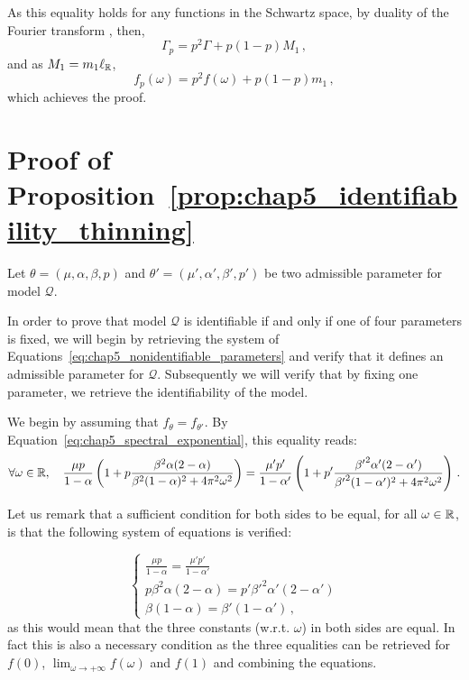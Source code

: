\begin{subappendices}
        As this equality holds for any functions in the Schwartz space, by duality of the Fourier transform \parencite{Pinsky2008}, then,
        \[\Gamma_p = p^2 \Gamma + p(1-p) M_1\,,\]
        and as $M_1 = m_1 \ell_{{\mathbb R}}$,
        \[f_p(\omega) = p^2 f(\omega) + p(1-p) m_1\,,\]
        which achieves the proof.



    \section{Proof of Proposition~\ref{prop:chap5_identifiability_thinning}}\label{appendix:chap5_proof_identifiability_thinning}

    Let $\theta = (\mu, \alpha, \beta, p)$ and $\theta' = (\mu', \alpha', \beta', p')$ be two admissible parameter for model $\mathcal{Q}$.

    In order to prove that model $\mathcal{Q}$ is identifiable if and only if one of four parameters is fixed, 
    we will begin by retrieving the system of Equations~\eqref{eq:chap5_nonidentifiable_parameters}
    and verify that it defines an admissible parameter for $\mathcal{Q}$.
    Subsequently we will verify that by fixing one parameter, we retrieve the identifiability of the model.
    
    We begin by assuming that $f_\theta = f_{\theta'}$.
    By Equation~\eqref{eq:chap5_spectral_exponential}, this equality reads:
    \[\forall \omega \in {\mathbb R},\quad 
    \frac{\mu p }{1-\alpha}\left(1 + p \frac{\beta^2 \alpha (2-\alpha)}{\beta^2(1-\alpha)^2 + 4 \pi^2 \omega^2}\right) = 
    \frac{\mu' p' }{1-\alpha'}\left(1 + p' \frac{{\beta'}^2 \alpha' (2-\alpha')}{{\beta'}^2(1-\alpha')^2 + 4 \pi^2 \omega^2}\right)\,.
    \]

    Let us remark that a sufficient condition for both sides to be equal, 
    for all $\omega \in {\mathbb R}$,
    is that the following system of equations is verified:

    \begin{equation}\label{eq:chap5_system_identifiability}
        \begin{cases}
            \frac{\mu p }{1-\alpha} = \frac{\mu' p'}{1-\alpha'}\\
            p \beta^2 \alpha(2-\alpha) = p' {\beta'}^2 \alpha'(2-\alpha')\\
            \beta (1-\alpha) = \beta' (1-\alpha')\,,
        \end{cases}
    \end{equation}
    as this would mean that the three constants (w.r.t. $\omega$) in both sides are equal.
    In fact this is also a necessary condition as the three equalities can be retrieved for $f(0)$, $\lim_{\omega\to+\infty}{f(\omega)}$ and $f(1)$
    and combining the equations.


\end{subappendices}

